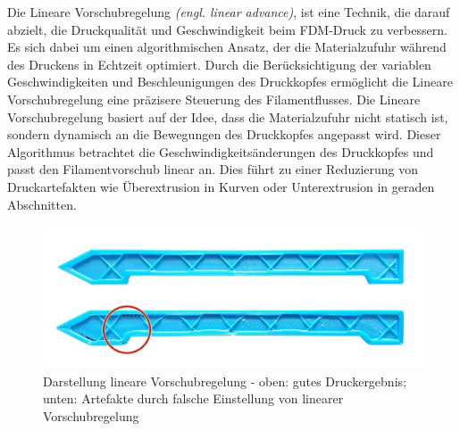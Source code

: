Die Lineare Vorschubregelung \textit{(engl. linear advance)}, ist eine Technik, die darauf abzielt, die Druckqualität und Geschwindigkeit beim FDM-Druck zu verbessern. Es sich dabei um einen algorithmischen Ansatz, der die Materialzufuhr während des Druckens in Echtzeit optimiert. Durch die Berücksichtigung der variablen Geschwindigkeiten und Beschleunigungen des Druckkopfes ermöglicht die Lineare Vorschubregelung eine präzisere Steuerung des Filamentflusses.
Die Lineare Vorschubregelung basiert auf der Idee, dass die Materialzufuhr nicht statisch ist, sondern dynamisch an die Bewegungen des Druckkopfes angepasst wird. Dieser Algorithmus betrachtet die Geschwindigkeitsänderungen des Druckkopfes und passt den Filamentvorschub linear an. Dies führt zu einer Reduzierung von Druckartefakten wie Überextrusion in Kurven oder Unterextrusion in geraden Abschnitten. \autocite{prusaLinearAdvance}

\begin{figure}[h]
	\centering
	\includegraphics[width=0.8\linewidth]{bilder/img_linear-advance.jpeg}
        \caption[Darstellung lineare Vorschubregelung] {Darstellung lineare Vorschubregelung - oben: gutes Druckergebnis; unten: Artefakte durch falsche Einstellung von linearer Vorschubregelung \autocite{prusaLinearAdvance}}
	\label{fig:linearadvance}
\end{figure}